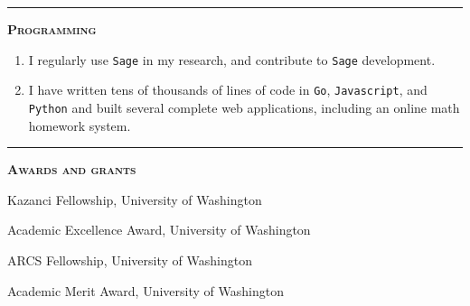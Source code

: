 \documentclass[12pt]{article}
\newcommand{\sectionheading}[1]
{
\bigskip %
\noindent
\hspace{-6.5mm}\textcolor{Gray}{\rule[.75mm]{21.5mm}{1mm}} %
\hspace{.2mm}	%
{\large{\textbf{\textsc{#1}}}} %
}
\newenvironment{date_section}
	{
	\vspace{-1ex}
	\leftmargini = 15ex
		\begin{itemize}[
			labelsep = *,
			labelwidth = 9ex,
			labelindent = 0ex,
			itemindent = !,
			font=\normalfont,
			align=parleft
		]{}
		\itemsep=-1.5mm
	}
	{\end{itemize}\vspace{-2ex}}
\newcommand{\yearmo}[2]{
	\item[
		{\makebox[1ex][r]{#1}}
		\hspace{1ex}
		{\makebox[1ex][l]{#2} }
		] }
\begin{document}
	\sectionheading{Programming}%
	
	\begin{enumerate}[label=$\bullet$, itemsep=-1mm, leftmargin=24mm]
		\item I regularly use {\tt Sage} in my research, and contribute to {\tt Sage} development.
		\item I have written tens of thousands of lines of code in {\tt Go}, {\tt Javascript}, and {\tt Python} and built several complete web applications, including an online math homework system.
	\end{enumerate}




	\sectionheading{Awards and grants}%
	
	\begin{date_section}
		\yearmo{}{2017}%
		Kazanci Fellowship, University of Washington
		\yearmo{}{2014}%
		Academic Excellence Award, University of Washington
		\yearmo{}{2013}%
		ARCS Fellowship, University of Washington
		\yearmo{}{2013}%
		Academic Merit Award, University of Washington
	\end{date_section}
\end{document}

